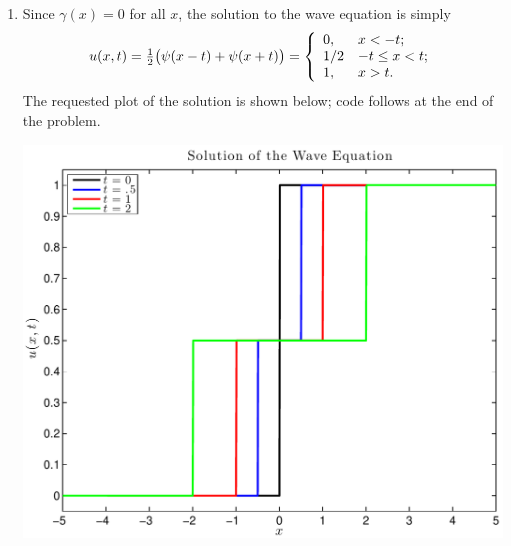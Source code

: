 {\begin{solution}
\begin{enumerate}
\item Since $\gamma(x) = 0$ for all $x$, the solution to the wave equation is simply
     \[ u(x,t) = {\textstyle{1\over2}}\big(\psi(x-t) + \psi(x+t)\big) 
               = \left\{\begin{array}{ll}
                  0, &  x < -t; \\
                 1/2 &  -t \le x < t;\\
                  1, &  x > t. 
                 \end{array}\right. \]
       The requested plot of the solution is shown below; code follows at the end of the problem.
       \begin{center}\includegraphics[scale=0.7]{heat_v_wave1}\end{center}


\end{enumerate}
\end{solution}}
